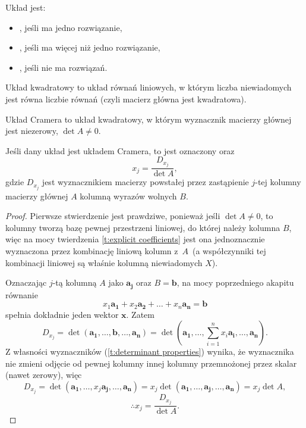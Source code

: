 \begin{definition}
    Układ jest:
    \begin{itemize}
        \item {}, jeśli ma jedno rozwiązanie,
        \item {}, jeśli ma więcej niż jedno rozwiązanie,
        \item {}, jeśli nie ma rozwiązań.
    \end{itemize}
\end{definition}

\begin{definition}
    Układ kwadratowy to układ równań liniowych, w którym liczba niewiadomych jest równa liczbie równań (czyli macierz główna jest kwadratowa).
\end{definition}

\begin{definition}
    Układ Cramera to układ kwadratowy, w którym wyznacznik macierzy głównej jest niezerowy, $\det A \neq 0$.
\end{definition}

\begin{theorem}[Cramera]
    \label{t:Cramer}
    Jeśli dany układ jest układem Cramera, to jest oznaczony oraz
    \[ x_j = \frac{D_{x_j}}{\det A}, \]
    gdzie $D_{x_j}$ jest wyznacznikiem macierzy powstałej przez zastąpienie $j$-tej kolumny macierzy głównej $A$ kolumną wyrazów wolnych $B$.
\end{theorem}
\begin{proof}
    Pierwsze stwierdzenie jest prawdziwe, ponieważ jeśli $\det A \neq 0$, to kolumny tworzą bazę pewnej przestrzeni liniowej, do której należy kolumna $B$, więc na mocy twierdzenia \ref{t:explicit coefficients} jest ona jednoznacznie wyznaczona przez kombinację liniową kolumn z~$A$~(a współczynniki tej kombinacji liniowej są właśnie kolumną niewiadomych $X$).

    Oznaczając $j$-tą kolumną $A$ jako $\symbf{a_j}$ oraz $B = \symbf{b}$, na mocy poprzedniego akapitu równanie
    \[ x_1\symbf{a_1} + x_2\symbf{a_2} + \ldots + x_n\symbf{a_n} = \symbf{b} \]
    spełnia dokładnie jeden wektor $\symbf{x}$. Zatem
    \[ D_{x_j} = \det(\symbf{a_1}, \ldots, \symbf{b}, \ldots, \symbf{a_n}) = \det(\symbf{a_1}, \ldots, \sum_{i=1}^n x_i\symbf{a_i}, \ldots, \symbf{a_n}). \]
    Z własności wyznaczników (\ref{t:determinant properties}) wynika, że wyznacznika nie zmieni odjęcie od pewnej kolumny innej kolumny przemnożonej przez skalar (nawet zerowy), więc
    \[ D_{x_j} = \det(\symbf{a_1}, \ldots, x_j\symbf{a_j}, \ldots, \symbf{a_n}) = x_j\det(\symbf{a_1}, \ldots, \symbf{a_j}, \ldots, \symbf{a_n}) = x_j \det A, \]
    \[ \therefore x_j = \frac{D_{x_j}}{\det A}. \]
\end{proof}

